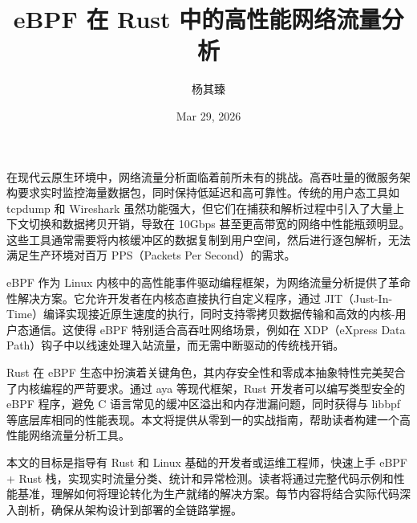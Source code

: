 \title{eBPF 在 Rust 中的高性能网络流量分析}
\author{杨其臻}
\date{Mar 29, 2026}
\maketitle
在现代云原生环境中，网络流量分析面临着前所未有的挑战。高吞吐量的微服务架构要求实时监控海量数据包，同时保持低延迟和高可靠性。传统的用户态工具如 tcpdump 和 Wireshark 虽然功能强大，但它们在捕获和解析过程中引入了大量上下文切换和数据拷贝开销，导致在 10Gbps 甚至更高带宽的网络中性能瓶颈明显。这些工具通常需要将内核缓冲区的数据复制到用户空间，然后进行逐包解析，无法满足生产环境对百万 PPS（Packets Per Second）的需求。\par
eBPF 作为 Linux 内核中的高性能事件驱动编程框架，为网络流量分析提供了革命性解决方案。它允许开发者在内核态直接执行自定义程序，通过 JIT（Just-In-Time）编译实现接近原生速度的执行，同时支持零拷贝数据传输和高效的内核-用户态通信。这使得 eBPF 特别适合高吞吐网络场景，例如在 XDP（eXpress Data Path）钩子中以线速处理入站流量，而无需中断驱动的传统栈开销。\par
Rust 在 eBPF 生态中扮演着关键角色，其内存安全性和零成本抽象特性完美契合了内核编程的严苛要求。通过 aya 等现代框架，Rust 开发者可以编写类型安全的 eBPF 程序，避免 C 语言常见的缓冲区溢出和内存泄漏问题，同时获得与 libbpf 等底层库相同的性能表现。本文将提供从零到一的实战指南，帮助读者构建一个高性能网络流量分析工具。\par
本文的目标是指导有 Rust 和 Linux 基础的开发者或运维工程师，快速上手 eBPF + Rust 栈，实现实时流量分类、统计和异常检测。读者将通过完整代码示例和性能基准，理解如何将理论转化为生产就绪的解决方案。每节内容将结合实际代码深入剖析，确保从架构设计到部署的全链路掌握。\par
